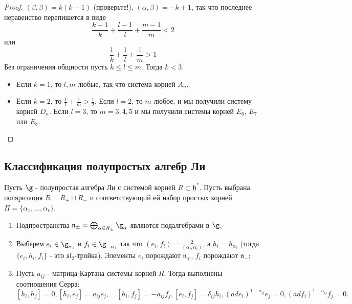\documentclass[a4article]{article}
\begin{document}
\begin{proof}
    $(\beta, \beta) = k(k-1)$ (проверьте!), $(\alpha, \beta)=-k+1$, так что последнее неравенство перепишется в виде
    $$\frac{k-1}{k}+\frac{l-1}{l}+\frac{m-1}{m}<2$$ или
    $$\frac{1}{k}+\frac{1}{l}+\frac{1}{m}>1$$
    Без ограничения общности пусть $k \le l \le m$. Тогда $k < 3$.
    \begin{itemize}
        \item Если $k=1$, то $l,m$ любые, так что система корней $A_n$. 
        \item Если $k=2$, то $\frac{1}{l}+\frac{1}{m}>\frac{1}{2}$. Если $l=2$, то $m$ любое, и мы получили систему корней $D_n$. Если $l=3$, то $m=3, 4, 5$ и мы получили системы корней $E_6$, $E_7$ или $E_8$.
    \end{itemize}
\end{proof}
\subsection*{Классификация полупростых алгебр Ли}
\begin{theorem}
    Пусть $\g$ - полупростая алгебра Ли с системой корней $R \subset \mathfrak{h}^{*}$. Пусть выбрана поляризация $R = R_{+} \sqcup R_{-}$ и соответствующий ей набор простых корней $\Pi = \{\alpha_1, \ldots, \alpha_r\}$.
    \begin{enumerate}
        \item Подпространства $\mathfrak{n}_{\pm}=\bigoplus_{\alpha \in R_{\pm}}\g_{\alpha}$ являются подалгебрами в $\g$,
        \item Выберем $e_i \in \g_{\alpha_i}$ и $f_i \in \g_{-\alpha_i}$ так что $(e_i, f_i) = \frac{2}{(\alpha_i, \alpha_i)}$, а $h_i = h_{\alpha_i}$ (тогда $\{e_i, h_i, f_i\}$ - это $\mathfrak{sl}_2$-тройка). Элементы $e_i$ порождают $\mathfrak{n}_{+}$, $f_i$ порождают $\mathfrak{n}_{-}$;
        \item Пусть $a_{ij}$ - матрица Картана системы корней $R$. Тогда выполнены соотношения Серра:
        \begin{subequations}
            \begin{equation}
                [h_i, h_j] = 0,
            \end{equation}
            \begin{equation}
                [h_i, e_j]=a_{ij}e_j, \quad [h_i, f_j]=-a_{ij}f_j,
            \end{equation}
            \begin{equation}
                [e_i, f_j] = \delta_{ij}h_i,
            \end{equation}
            \begin{equation}
                (ad e_i)^{1-a_{ij}}e_j = 0,
            \end{equation}
            \begin{equation}
                (ad f_i)^{1-a_{ij}}f_j = 0.
            \end{equation}
        \end{subequations}
    \end{enumerate}
\end{theorem}
\end{document}
